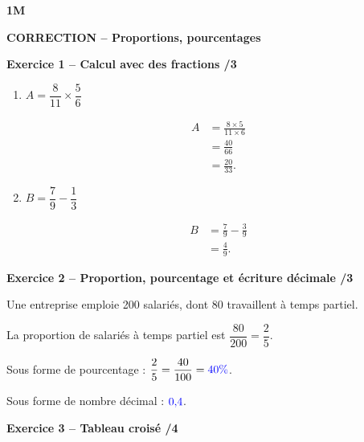 \documentclass[10pt,a4paper]{article}
\renewcommand{\niveau}{1M}
\renewcommand{\chapitre}{Proportions, pourcentages}
\renewcommand{\interroversion}[1]{
    \noindent\textbf{\niveau}

    \vspace{-0.5cm}
    \begin{center}
        \textbf{\large CORRECTION -- \chapitre}
    \end{center}

    \vspace{0.1cm}
}
\begin{document}
\interroversion{C}

\textbf{Exercice 1 -- Calcul avec des fractions \hfill /3}

\begin{enumerate}
\item \(A = \dfrac{8}{11}\times\dfrac{5}{6}\)

\[
\begin{aligned}
A &= \frac{8\times5}{11\times6}\\
  &= \frac{40}{66}\\
  &= \frac{20}{33}.
\end{aligned}
\]

\item \(B = \dfrac{7}{9}-\dfrac{1}{3}\)

\[
\begin{aligned}
B &= \frac{7}{9}-\frac{3}{9}\\
  &= \frac{4}{9}.
\end{aligned}
\]
\end{enumerate}

\textbf{Exercice 2 -- Proportion, pourcentage et écriture décimale \hfill /3}

Une entreprise emploie 200 salariés, dont 80 travaillent à temps partiel.

La proportion de salariés à temps partiel est \(\dfrac{80}{200}=\dfrac{2}{5}\).

Sous forme de pourcentage : \(\dfrac{2}{5}=\dfrac{40}{100}=\textcolor{blue}{40\%}\).

Sous forme de nombre décimal : \(\textcolor{blue}{0{,}4}\).

\textbf{Exercice 3 -- Tableau croisé \hfill /4}
\end{document}
